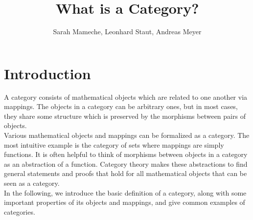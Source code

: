 
\def\pathToRoot{../}

\usepackage{charter}
\selectfont


\title{What is a Category?}
\author{Sarah Mameche, Leonhard Staut, Andreas Meyer}
\maketitle
\section {Introduction}
A category consists of mathematical objects which are related to one another via mappings. The objects in a category can be arbitrary ones, but in most cases, they share some structure which is preserved by the morphisms between pairs of objects.\\ Various mathematical objects and mappings can be formalized as a category. The most intuitive example is the category of sets where mappings are simply functions. It is often helpful to think of morphisms between objects in a category as an abstraction of a function. Category theory makes these abstractions to find general statements and proofs that hold for all mathematical objects that can be seen as a category.
\\ In the following, we introduce the basic definition of a category, along with some important properties of its objects and mappings, and give common examples of categories.
